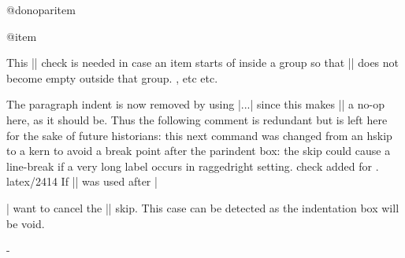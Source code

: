  \begin{docCommand} {@donoparitem} { }
 \end{docCommand}
    \begin{teX}
\def\@donoparitem{%
  \@noparitemfalse
  \global\setbox\@labels\hbox{\hskip -\leftmargin
                               \unhbox\@labels
                                \hskip \leftmargin}%
  \if@minipage
    \else
      \@tempskipa\lastskip
      \vskip -\lastskip
      \advance\@tempskipa\@outerparskip
      \advance\@tempskipa -\parskip
      \vskip\@tempskipa
  \fi}
    \end{teX}

 
 \begin{docCommand}{@item}{}
 \end{docCommand}
     \begin{teX}
\def\@item[#1]{%
  \if@noparitem
    \@donoparitem
  \else
    \if@inlabel
      \indent \par
    \fi
    \ifhmode
      \unskip\unskip \par
    \fi
    \if@newlist
      \if@nobreak
        \@nbitem
      \else
        \addpenalty\@beginparpenalty
        \addvspace\@topsep
        \addvspace{-\parskip}%
      \fi
    \else
      \addpenalty\@itempenalty
      \addvspace\itemsep
    \fi
    \global\@inlabeltrue
  \fi
  \everypar{%
    \@minipagefalse
    \global\@newlistfalse
    \end{teX}
    This |\if@inlabel| check is needed in case an item starts of
    inside a group so that |\everypar| does not become empty
    outside that group. 
 \@nobreakfalse, etc etc.
    \begin{teX}
    \if@inlabel
      \global\@inlabelfalse
    \end{teX}
    The paragraph indent is now removed by using |\setbox...| since
    this makes |\noindent| a no-op here, as it should be. Thus the
    following comment is redundant but is left here for the sake of
    future historians:
    this next command was changed from an hskip to a kern to avoid
    a break point after the parindent box: the skip could cause a
    line-break if a very long label occurs in raggedright setting.
    { check added for . latex/2414}
 If |\noindent| was used after |\item| want to cancel the |\itemindent|
 skip. This case can be detected as the indentation box will be void.
    \begin{teX}
      {\setbox\z@\lastbox
       \ifvoid\z@
         \kern-\itemindent
       \fi}%
    \end{teX}

